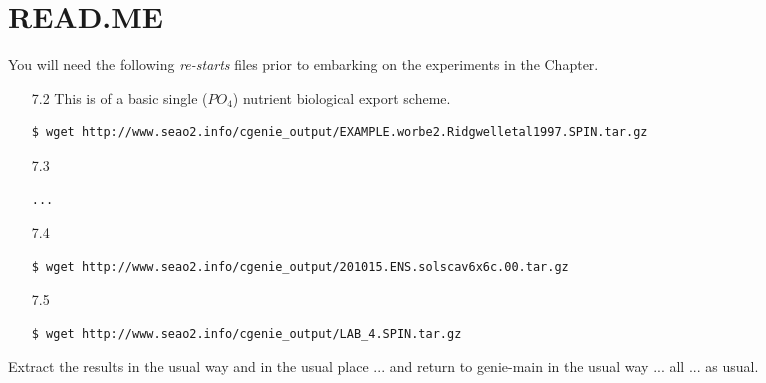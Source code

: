 \documentclass[11pt,fleqn]{book} %
\begin{document}
\hfill \break

\vspace{24mm}

\noindent


\newpage



\section*{READ.ME}

You will need the following \textit{re-starts} files prior to embarking on the experiments in the Chapter.
\vspace{1mm}

\begin{itemize}[noitemsep]
\vspace{1mm}
\item [7.2] This is of a basic single (\(PO_{4}\)) nutrient biological export scheme.
\small \begin{verbatim}
$ wget http://www.seao2.info/cgenie_output/EXAMPLE.worbe2.Ridgwelletal1997.SPIN.tar.gz
\end{verbatim} \normalsize
\vspace{1mm}
\item [7.3] 
\small \begin{verbatim}
...
\end{verbatim} \normalsize
\vspace{1mm}
\item [7.4] 
\small \begin{verbatim}
$ wget http://www.seao2.info/cgenie_output/201015.ENS.solscav6x6c.00.tar.gz
\end{verbatim} \normalsize
\vspace{1mm}
\item [7.5] 
\small \begin{verbatim}
$ wget http://www.seao2.info/cgenie_output/LAB_4.SPIN.tar.gz
\end{verbatim} \normalsize
\end{itemize}
\vspace{1mm}

\noindent Extract the results in the usual way and in the usual place ... and return to \textsf{\footnotesize genie-main} in the usual way ... all ... as usual.

\end{document}
